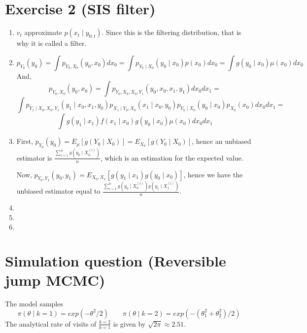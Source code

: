 \documentclass[12pt,letterpaper]{article}
\begin{document}
\section*{Exercise 2 (SIS filter)}
\begin{enumerate}[leftmargin=!,labelindent=5pt]
\item $v_t$ approximate $p(x_t \mid y_{0:t})$. Since this is the
filtering distribution, that is why it is called a filter.

\item 
$$
p_{Y_0}(y_0) = \int p_{Y_0,X_0}(y_0, x_0)dx_0
= \int p_{Y_0\mid X_0}(y_0\mid x_0)p(x_0)dx_0 = 
\int g(y_0 \mid x_0) \mu(x_0)dx_0
$$
And,
$$
p_{Y_0,X_0}(y_0, x_0) = \int p_{Y_0,X_0,X_0,Y_1}(y_0, x_0,x_1,y_1)dx_0 dx_1
= $$
$$
\int 
p_{Y_1 \mid X_0,X_0,Y_1}(y_1 \mid x_0,x_1,y_0)
p_{X_1 \mid Y_0,X_0}(x_1 \mid x_0,y_0)
p_{Y_0 \mid X_0}(y_0 \mid x_0) p_{X_0}(x_0)
dx_0 dx_1 =
$$
$$
\int 
g(y_1 \mid x_1)
f(x_1 \mid x_0)
g(y_0 \mid x_0) \mu(x_0)
dx_0 dx_1
$$

\item First, $p_{Y_0}(y_0) = E_\mu[g(Y_0 \mid X_0)] =
E_{X_0}[g(Y_0 \mid X_0)]$, hence an unbiased estimator is 
$\frac{\sum^n_{i=1} g(y_0 \mid X_0^{(i)})}{n}$, which is an estimation
for the expected value.

Now, $p_{Y_0,Y_1}(y_0, y_1) = E_{X_0,X_1}[g(y_1 \mid x_1)g(y_0 \mid x_0)]$,
hence we have the unbiased estimator equal to 
$\frac{\sum^n_{i=1} g(y_0 \mid X_0^{(i)})
g (y_1 \mid X_1^{(i)})}{n}$.

\item
\item 
\item 
\end{enumerate}



\newpage
\section*{Simulation question (Reversible jump MCMC)}
The model samples
$$
\pi(\theta \mid k=1) = exp(-\theta^2/2)
\quad \quad
\pi(\theta \mid k=2) = exp(-(\theta_1^2 + \theta_2^2)/2)
$$
The analytical rate of visits of $\frac{k=2}{k=1}$
is given by $\sqrt{2\pi} \approx 2.51$.
\end{document}
